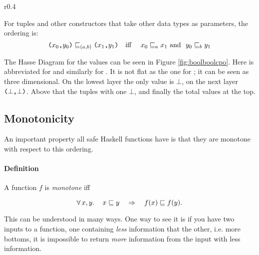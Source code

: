 \begin{wrapfigure}[25]{r}{0.4\textwidth} %
\begin{center}
\vspace{-30pt}

\caption{
    \texttt{(Bool,Bool)} partial order.
    \label{fig:boolboolcpo}
}
\end{center}
\end{wrapfigure} %
For tuples and other constructors that take other data types as
parameters, the ordering is:
\begin{equation*}
\hstup{x_0}{y_0} \sqsubseteq_{(a,b)} \hstup{x_1}{y_1} \text{\quad iff \quad}
x_0 \sqsubseteq_a x_1 \text{\w and \w} y_0 \sqsubseteq_b y_1
\end{equation*}

The Hasse Diagram for the  values can be seen in
Figure \ref{fig:boolboolcpo}. Here  is abbreviated for 
and similarly for . It is not flat as the one for ;
it can be seen as three dimensional. On the lowest layer the only
value is $\bot$, on the next layer $\hstup{\bot}{\bot}$. Above that
the tuples with one $\bot$, and finally the total values at the
top.

\vspace{55pt}

\subsection{Monotonicity}
 An important property all safe Haskell functions have is that they are
monotone with respect to this ordering.

\paragraph{Definition} A function $f$ is \emph{monotone} iff

\begin{equation*}
\forall \, x , y . \, \quad x \sqsubseteq y \quad \Rightarrow \quad f(x) \sqsubseteq f(y).
\end{equation*}

This can be understood in many ways. One way to see it is if you have
two inputs to a function, one containing \emph{less} information that
the other, i.e. more bottoms, it is impossible to return \emph{more}
information from the input with less information.

